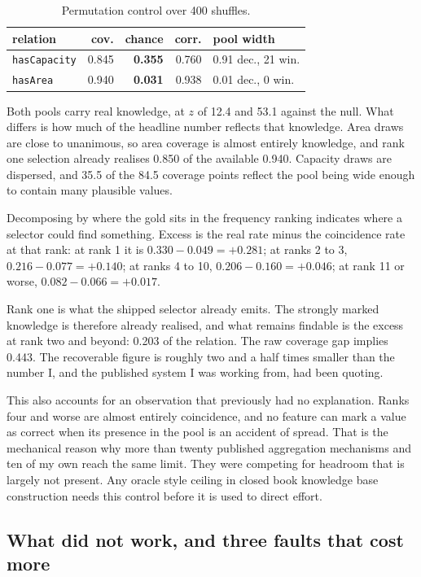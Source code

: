 \documentclass[11pt]{article}
\begin{document}
\begin{table}[t]
\centering\small
\begin{tabular}{lrrrl}
\toprule
relation & cov. & chance & corr. & pool width \\
\midrule
\texttt{hasCapacity} & 0.845 & \textbf{0.355} & 0.760 & 0.91 dec., 21 win. \\
\texttt{hasArea} & 0.940 & \textbf{0.031} & 0.938 & 0.01 dec., 0 win. \\
\bottomrule
\end{tabular}
\caption{Permutation control over 400 shuffles.}
\label{tab:perm}
\end{table}

Both pools carry real knowledge, at $z$ of 12.4 and 53.1 against the null. What
differs is how much of the headline number reflects that knowledge. Area draws
are close to unanimous, so area coverage is almost entirely knowledge, and rank
one selection already realises 0.850 of the available 0.940. Capacity draws are
dispersed, and 35.5 of the 84.5 coverage points reflect the pool being wide
enough to contain many plausible values.

Decomposing by where the gold sits in the frequency ranking indicates where a
selector could find something. Excess is the real rate minus the coincidence rate
at that rank: at rank 1 it is $0.330 - 0.049 = +0.281$; at ranks 2 to 3,
$0.216 - 0.077 = +0.140$; at ranks 4 to 10, $0.206 - 0.160 = +0.046$; at rank 11
or worse, $0.082 - 0.066 = +0.017$.

Rank one is what the shipped selector already emits. The strongly marked
knowledge is therefore already realised, and what remains findable is the excess
at rank two and beyond: 0.203 of the relation. The raw coverage gap implies
0.443. The recoverable figure is roughly two and a half times smaller than the
number I, and the published system I was working from, had been quoting.

This also accounts for an observation that previously had no explanation. Ranks
four and worse are almost entirely coincidence, and no feature can mark a value
as correct when its presence in the pool is an accident of spread. That is the
mechanical reason why more than twenty published aggregation mechanisms and ten
of my own reach the same limit. They were competing for headroom that is largely
not present. Any oracle style ceiling in closed book knowledge base construction
needs this control before it is used to direct effort.

\subsection{What did not work, and three faults that cost more}
\end{document}
